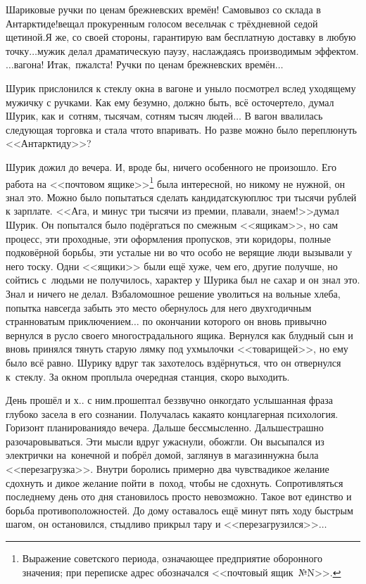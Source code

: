 {	\diagdash Шариковые ручки по ценам брежневских времён! Самовывоз со склада в Антарктиде!\mdash вещал прокуренным голосом весельчак с трёхдневной седой щетиной.\mdash Я же, со своей стороны, гарантирую вам бесплатную доставку в любую точку$\ldots$\mdash мужик делал драматическую паузу, наслаждаясь производимым эффектом.\mdash $\ldots$вагона! Итак,~пжалста! Ручки по ценам брежневских времён$\ldots$
	
	Шурик прислонился к стеклу окна в вагоне и уныло посмотрел вслед уходящему мужичку с ручками. Как ему безумно, должно быть, всё осточертело, думал Шурик, как и~сотням, тысячам, сотням тысяч людей$\ldots$ В вагон ввалилась следующая торговка и стала что\sdash то впаривать. Но разве можно было переплюнуть <<Антарктиду>>? 
	
	Шурик дожил до вечера. И, вроде бы, ничего особенного не произошло. Его работа на <<почтовом ящике>>\footnote{Выражение советского периода, означающее предприятие оборонного значения; при переписке адрес обозначался <<почтовый ящик~№N>>.} была интересной, но никому не нужной, он знал это. Можно было попытаться сделать кандидатскую\mdash плюс три тысячи рублей к зарплате. <<Ага, и минус три тысячи из премии, плавали, знаем!>>\mdash думал Шурик. Он попытался было подёргаться по смежным <<ящикам>>, но сам процесс, эти проходные, эти оформления пропусков, эти коридоры, полные подковёрной борьбы, эти усталые ни во что особо не верящие люди вызывали у него тоску. Одни <<ящики>> были ещё хуже, чем его, другие получше, но сойтись с~людьми не получилось, характер у Шурика был не сахар и он знал это. Знал и ничего не делал. Взбаломошное решение уволиться на вольные хлеба, попытка навсегда забыть это место обернулось для него двухгодичным странноватым приключением$\ldots$ по окончании которого он вновь привычно вернулся в русло своего многострадального ящика. Вернулся как блудный сын и вновь принялся тянуть старую лямку под ухмылочки <<товарищей>>, но ему было всё равно. Шурику вдруг так захотелось вздёрнуться, что он отвернулся к~стеклу. За окном проплыла очередная станция, скоро выходить.
	
	\diagdash День прошёл и х.. с ним.\mdash прошептал беззвучно он\mdash когда\sdash то услышанная фраза глубоко засела в его сознании. Получалась какая\sdash то концлагерная психология. Горизонт планирования\mdash до вечера. Дальше бессмысленно. Дальше\mdash страшно разочаровываться. Эти мысли вдруг ужаснули, обожгли. Он высыпался из электрички на~конечной и побрёл домой, заглянув в магазин\mdash нужна была <<перезагрузка>>. Внутри боролись примерно два чувства\mdash дикое желание сдохнуть и дикое желание пойти в~поход, чтобы не сдохнуть. Сопротивляться последнему день ото дня становилось просто невозможно. Такое вот единство и борьба противоположностей. До дому оставалось ещё минут пять ходу быстрым шагом, он остановился, стыдливо прикрыл тару и <<перезагрузился>>$\ldots$
	
}
